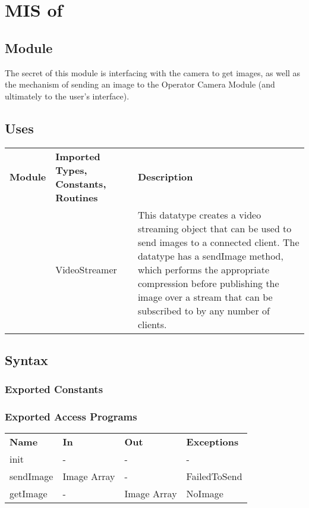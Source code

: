 \documentclass[12pt, titlepage]{article}
\begin{document}
\section{MIS of } \label{MIS_DRONE_CAMERA} 
\subsection{Module}
The secret of this module is interfacing with the camera to get images, as well as the mechanism of sending an image to the Operator Camera Module (and ultimately to the user's interface).
\subsection{Uses}
\begin{center}
\begin{tabular}{p{2 cm} p{5cm} p{6.5cm} } 
\hline
\textbf{Module} & \textbf{Imported Types, Constants, Routines} & \textbf{Description} \\
\nameref{GStreamer} & VideoStreamer & This datatype creates a video streaming object that can be used to send images to a connected client. The datatype has a sendImage method, which performs the appropriate compression before publishing the image over a stream that can be subscribed to by any number of clients. \\
\hline
\hline
\end{tabular}
\end{center}
\subsection{Syntax}
\subsubsection{Exported Constants}
\subsubsection{Exported Access Programs}
\begin{center}
\begin{tabular}{p{3.5cm} p{2.5cm} p{2.5cm} p{5cm}} 
\hline
\textbf{Name} & \textbf{In} & \textbf{Out} & \textbf{Exceptions} \\
init & - & - & - \\
sendImage & Image Array & - & FailedToSend \\
getImage & - & Image Array & NoImage \\
\hline
\hline
\end{tabular}
\end{center}
\end{document}
